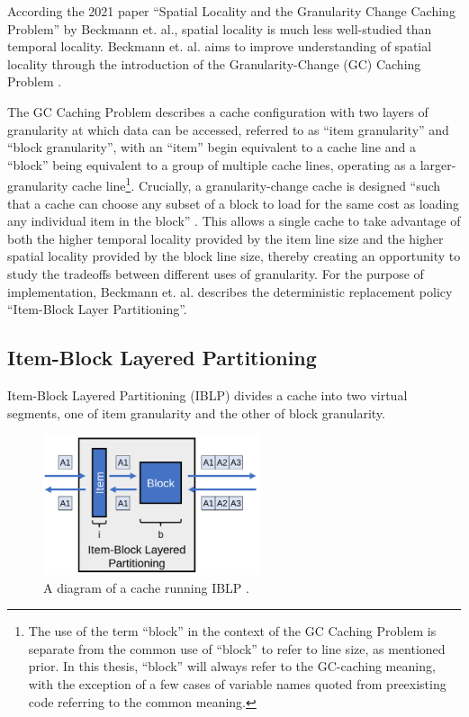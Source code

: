 \documentclass[12pt,twoside]{reedthesis}
\begin{document}
According the 2021 paper ``Spatial Locality and the Granularity Change Caching Problem'' by Beckmann et. al., spatial locality is much less well-studied than temporal locality. Beckmann et. al. aims to improve understanding of spatial locality through the introduction of the Granularity-Change (GC) Caching Problem \cite{beckmann}.

The GC Caching Problem describes a cache configuration with two layers of granularity at which data can be accessed, referred to as ``item granularity'' and ``block granularity'', with an ``item'' begin equivalent to a cache line and a ``block'' being equivalent to a group of multiple cache lines, operating as a larger-granularity cache line\footnote{The use of the term ``block'' in the context of the GC Caching Problem is separate from the common use of ``block'' to refer to line size, as mentioned prior. In this thesis, ``block'' will always refer to the GC-caching meaning, with the exception of a few cases of variable names quoted from preexisting code referring to the common meaning.}. Crucially, a granularity-change cache is designed ``such that a cache can choose any subset of a block to load for the same cost as loading any individual item in the block'' \cite{beckmann}. This allows a single cache to take advantage of both the higher temporal locality provided by the item line size and the higher spatial locality provided by the block line size, thereby creating an opportunity to study the tradeoffs between different uses of granularity. For the purpose of implementation, Beckmann et. al. describes the deterministic replacement policy ``Item-Block Layer Partitioning''.

	\subsection*{Item-Block Layered Partitioning}

	Item-Block Layered Partitioning (IBLP) divides a cache into two virtual segments, one of item granularity and the other of block granularity.

	\begin{figure}[h]
		\centering
		\includegraphics[width=2.5in]{figures/IBLP.png}
		\caption{A diagram of a cache running IBLP \cite{beckmann}.}
	\end{figure}
	
\end{document}
